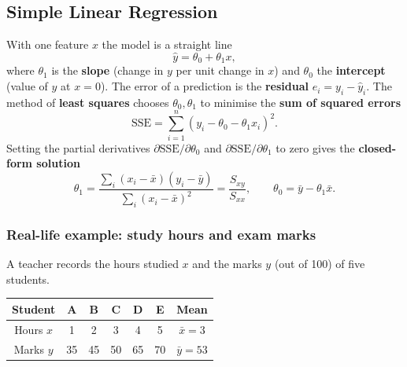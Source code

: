 \subsection{Simple Linear Regression}

With one feature $x$ the model is a straight line
\[
  \hat y=\theta_0+\theta_1x,
\]
where $\theta_1$ is the \textbf{slope} (change in $y$ per unit change in $x$) and $\theta_0$ the \textbf{intercept} (value of $y$ at $x=0$). The error of a prediction is the \textbf{residual} $e_i=y_i-\hat y_i$. The method of \textbf{least squares} chooses $\theta_0,\theta_1$ to minimise the \textbf{sum of squared errors}
\[
  \text{SSE}=\sum_{i=1}^{n}(y_i-\theta_0-\theta_1x_i)^2 .
\]
Setting the partial derivatives $\partial\text{SSE}/\partial\theta_0$ and $\partial\text{SSE}/\partial\theta_1$ to zero gives the \textbf{closed-form solution}
\begin{equation}\label{eq:ols}
  \theta_1=\frac{\sum_i(x_i-\bar x)(y_i-\bar y)}{\sum_i(x_i-\bar x)^2}=\frac{S_{xy}}{S_{xx}},\qquad
  \theta_0=\bar y-\theta_1\bar x .
\end{equation}

\subsubsection*{Real-life example: study hours and exam marks}

A teacher records the hours studied $x$ and the marks $y$ (out of 100) of five students.

\begin{center}
\begin{tabular}{@{}c|ccccc|c@{}}
\toprule
Student & A & B & C & D & E & Mean\\
\midrule
Hours $x$ & 1 & 2 & 3 & 4 & 5 & $\bar x=3$\\
Marks $y$ & 35 & 45 & 50 & 65 & 70 & $\bar y=53$\\
\bottomrule
\end{tabular}
\end{center}

